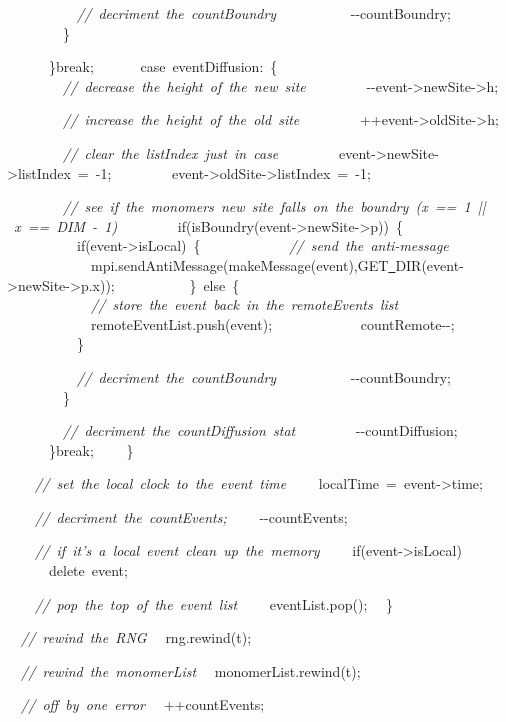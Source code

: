 {\ \ \ \ \ \ \ \ \ \ \textsl{//\ decriment\ the\ countBoundry}
\ \ \ \ \ \ \ \ \ \ -{}-{}countBoundry;
\ \ \ \ \ \ \ \ \}

\ \ \ \ \ \ \}break;
\ \ \ \ \ \ case\ eventDiffusion:\ \{
\ \ \ \ \ \ \ \ \textsl{//\ decrease\ the\ height\ of\ the\ new\ site}
\ \ \ \ \ \ \ \ -{}-{}event-{}>{}newSite-{}>{}h;

\ \ \ \ \ \ \ \ \textsl{//\ increase\ the\ height\ of\ the\ old\ site}
\ \ \ \ \ \ \ \ ++event-{}>{}oldSite-{}>{}h;

\ \ \ \ \ \ \ \ \textsl{//\ clear\ the\ listIndex\ just\ in\ case}
\ \ \ \ \ \ \ \ event-{}>{}newSite-{}>{}listIndex\ =\ -{}1;
\ \ \ \ \ \ \ \ event-{}>{}oldSite-{}>{}listIndex\ =\ -{}1;

\ \ \ \ \ \ \ \ \textsl{//\ see\ if\ the\ monomers\ new\ site\ falls\ on\ the\ boundry\ (x\ ==\ 1\ ||\ x\ ==\ DIM\ -{}\ 1)}
\ \ \ \ \ \ \ \ if(isBoundry(event-{}>{}newSite-{}>{}p))\ \{
\ \ \ \ \ \ \ \ \ \ if(event-{}>{}isLocal)\ \{
\ \ \ \ \ \ \ \ \ \ \ \ \textsl{//\ send\ the\ anti-{}message}
\ \ \ \ \ \ \ \ \ \ \ \ mpi.sendAntiMessage(makeMessage(event),GET\underline\ DIR(event-{}>{}newSite-{}>{}p.x));
\ \ \ \ \ \ \ \ \ \ \}\ else\ \{
\ \ \ \ \ \ \ \ \ \ \ \ \textsl{//\ store\ the\ event\ back\ in\ the\ remoteEvents\ list}
\ \ \ \ \ \ \ \ \ \ \ \ remoteEventList.push(event);
\ \ \ \ \ \ \ \ \ \ \ \ countRemote-{}-{};
\ \ \ \ \ \ \ \ \ \ \}

\ \ \ \ \ \ \ \ \ \ \textsl{//\ decriment\ the\ countBoundry}
\ \ \ \ \ \ \ \ \ \ -{}-{}countBoundry;
\ \ \ \ \ \ \ \ \}

\ \ \ \ \ \ \ \ \textsl{//\ decriment\ the\ countDiffusion\ stat}
\ \ \ \ \ \ \ \ -{}-{}countDiffusion;
\ \ \ \ \ \ \}break;
\ \ \ \ \}

\ \ \ \ \textsl{//\ set\ the\ local\ clock\ to\ the\ event\ time}
\ \ \ \ localTime\ =\ event-{}>{}time;

\ \ \ \ \textsl{//\ decriment\ the\ countEvents;}
\ \ \ \ -{}-{}countEvents;

\ \ \ \ \textsl{//\ if\ it's\ a\ local\ event\ clean\ up\ the\ memory}
\ \ \ \ if(event-{}>{}isLocal)
\ \ \ \ \ \ delete\ event;

\ \ \ \ \textsl{//\ pop\ the\ top\ of\ the\ event\ list}
\ \ \ \ eventList.pop();
\ \ \}

\ \ \textsl{//\ rewind\ the\ RNG}
\ \ rng.rewind(t);

\ \ \textsl{//\ rewind\ the\ monomerList}
\ \ monomerList.rewind(t);

\ \ \textsl{//\ off\ by\ one\ error}
\ \ ++countEvents;

}
